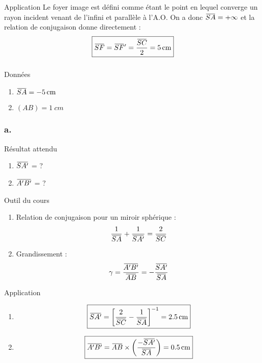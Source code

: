 \documentclass[10pt,a5paper,notitlepage]{book}
\begin{document}
\begin{lgtcb}{Application}
    Le foyer image est défini comme étant le point en lequel converge un rayon
    incident venant de l'infini et parallèle à l'A.O. On a donc $\SA = +\infty$
    et la relation de conjugaison donne directement :
    \[ \boxed{\SF = \SF' = \frac{\SC}{2} = \SI{5}{cm}} \]
\end{lgtcb}

\subsubsection{}
\begin{vtcb}{Données}
    \begin{enumerate}
        \item $\SA = \SI{-5}{cm}$
        \item $(AB) = \SI{1}{cm}$
    \end{enumerate}
\end{vtcb}

\setcounter{subsubsection}{1}
\subsubsection{a.}
\begin{rtcb}{Résultat attendu}
    \begin{enumerate}
        \item $\SAp$ = ?
        \item $\ABp$ = ?
    \end{enumerate}
\end{rtcb}

\begin{btcb}{Outil du cours}
    \begin{enumerate}
        \item Relation de conjugaison pour un miroir sphérique :
            \[ \frac{1}{\SA} + \frac{1}{\SAp} = \frac{2}{\SC} \]
        \item Grandissement :
            \[ \g = \frac{\ABp}{\ABb} = - \frac{\SAp}{\SA} \]
    \end{enumerate}
    
\end{btcb}

\begin{lgtcb}{Application}
    \begin{enumerate}
        \item \[ \boxed{\SAp = \left[ \frac{2}{\SC}- \frac{1}{\SA}\right]^{-1} =
            \SI{+2.5}{cm}}\]
        \item \[ \boxed{\ABp = \ABb\times \LR{-\SAp}{\SA} = \SI{0.5}{cm}} \]
    \end{enumerate}
\end{lgtcb}
\end{document}

